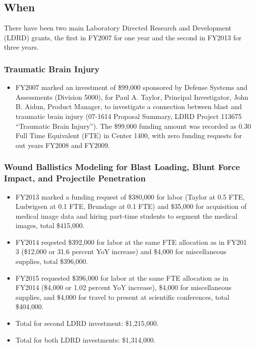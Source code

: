 \documentclass[12pt,reqno]{amsart}
\begin{document}
\subsection{When}
There have been two main Laboratory Directed Research and Development 
(LDRD) grants, the first in FY2007 for one year and the second in 
FY2013 for three years.

\subsubsection{Traumatic Brain Injury}
\begin{itemize}
\item FY2007 marked an investment of \$99,000 sponsored by Defense Systems 
and Assessments (Division 5000), for Paul A. Taylor, Principal Investigator, 
John B. Aidun, Product Manager, to investigate a connection between blast and 
traumatic brain injury (07-1614 Proposal Summary, LDRD Project 113675 
``Traumatic Brain Injury'').   The \$99,000 funding amount was recorded 
as 0.30 Full Time Equivalent (FTE) in Center 1400, with zero funding requests 
for out years FY2008 and FY2009.
\end{itemize}

\subsubsection{Wound Ballistics Modeling for Blast Loading, Blunt Force 
Impact, and Projectile Penetration}
\begin{itemize}
\item FY2013 marked a funding request of \$380,000 for labor 
(Taylor at 0.5 FTE, Ludwigsen at 0.1 FTE, Brundage at 0.1 FTE) and \$35,000 
for acquisition of medical image data and hiring part-time students to 
segment the medical images, total \$415,000.

\item FY2014 reqested \$392,000 for labor at the same FTE allocation as 
in FY201 3 (\$12,000 or 31.6 percent YoY increase) and \$4,000 for 
miscellaneous supplies, total \$396,000.

\item FY2015 requested \$396,000 for labor at the same FTE allocation 
as in FY2014 (\$4,000 or 1.02 percent YoY increase), \$4,000 for miscellaneous 
supplies, and \$4,000 for travel to present at scientific conferences, 
total \$404,000.

\item Total for second LDRD investment: \$1,215,000.

\item Total for both LDRD investments: \$1,314,000.
\end{itemize}
\end{document}
